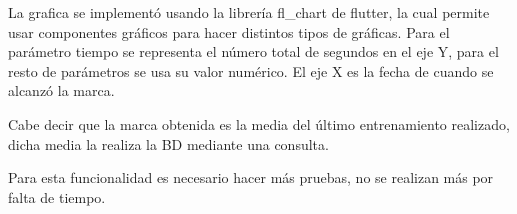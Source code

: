 La grafica se implementó usando la librería fl\_chart de flutter, la cual permite usar componentes gráficos para hacer distintos tipos de gráficas. Para el parámetro tiempo se representa el número total de segundos en el eje Y, para el resto de parámetros se usa su valor numérico. El eje X es la fecha de cuando se alcanzó la marca.

Cabe decir que la marca obtenida es la media del último entrenamiento realizado, dicha media la realiza la BD mediante una consulta.

Para esta funcionalidad es necesario hacer más pruebas, no se realizan más por falta de tiempo.